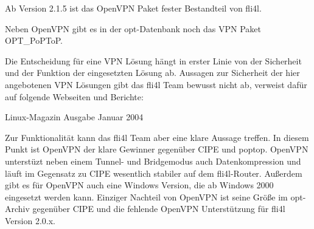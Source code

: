 
\sloppy

Ab Version 2.1.5 ist das OpenVPN Paket fester Bestandteil von fli4l.


Neben OpenVPN gibt es in der opt-Datenbank 
noch das VPN Paket OPT\_PoPToP.

Die Entscheidung für eine VPN Lösung hängt in erster Linie von der
Sicherheit und der Funktion der eingesetzten Lösung ab. Aussagen zur
Sicherheit der hier angebotenen VPN Lösungen gibt das fli4l Team
bewusst nicht ab, verweist dafür auf folgende Webseiten und Berichte:

Linux-Magazin Ausgabe Januar 2004





Zur Funktionalität kann das fli4l Team aber eine klare Aussage
treffen. In diesem Punkt ist OpenVPN der klare Gewinner gegenüber CIPE
und poptop. OpenVPN unterstüzt neben einem Tunnel- und Bridgemodus
auch Datenkompression und läuft im Gegensatz zu CIPE wesentlich
stabiler auf dem fli4l-Router. Außerdem gibt es für OpenVPN auch eine
Windows Version, die ab Windows 2000 eingesetzt werden kann.  Einziger
Nachteil von OpenVPN ist seine Größe im opt-Archiv gegenüber CIPE und
die fehlende OpenVPN Unterstützung für fli4l Version 2.0.x.

